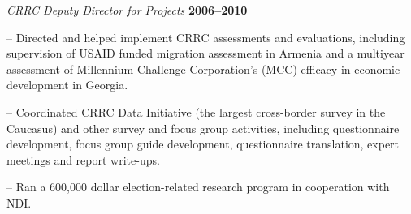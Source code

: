 {\vspace{-.3cm}
{\em CRRC Deputy Director for Projects} \hfill {\bf 2006--2010}\\
\begin{list1}
\item[]-- Directed and helped implement CRRC assessments and evaluations, including supervision of USAID funded migration assessment in Armenia and a multiyear assessment of Millennium Challenge Corporation's (MCC) efficacy in economic development in Georgia.
\item[]-- Coordinated CRRC Data Initiative (the largest cross-border survey in the Caucasus) and other survey and focus group activities, including questionnaire development, focus group guide development, questionnaire translation, expert meetings and report write-ups.
\item[]-- Ran a 600,000 dollar election-related research program in cooperation with NDI.
\end{list1}
}

\newcommand{\cvskills}{%
\textbf{Statistical Packages:} Stata, SPSS \\
\textbf{Computer Languages:} R, Python, bash and Unix shell scripts \\
\textbf{Computer Applications:} emacs, qGIS, ArcGIS, CSPro, \LaTeX{}, Inquisit Millisecond \\
\textbf{Languages:} Proficient in Spanish; Research skills in French, Georgian, German, Russian; Rusty in Slovak; Elementary Turkish, Swahili
}

\newcommand{\cvfieldresearch}{%
Armenia, 2006–2010 \\
Azerbaijan, 2006–2010 \\
Georgia, 2006–2010, 2014–15 \\
Kenya, 2010–2015 \\
Montenegro, 2025 \\
South Africa, 2014 \\
Ukraine, 2014, 2015, 2018, 2019 \\
United Arab Emirates, 2015
}

\newcommand{\cvotherservice}{%
\textbf{Volunteer}: \\
Open North (2017--2021): Advisor to applied research lab scientists. \\
Software Carpentry (2013--): Teach computational skills to scientists. \\
Transparify (2013--2016): Perform statistical analysis for NGO that promotes financial transparency amongst NGOs. \\
\textbf{International Election Observer}, Ukrainian 2019 Parliamentary Elections, South African 2014 General Elections, Georgian 2008 Presidential Elections, 2008 Ach'aran Supreme Council Elections.
}

\newcommand{\cvcareerinterruptions}{%
Parental leave: Autumn 2020, Autumn 2022
}
